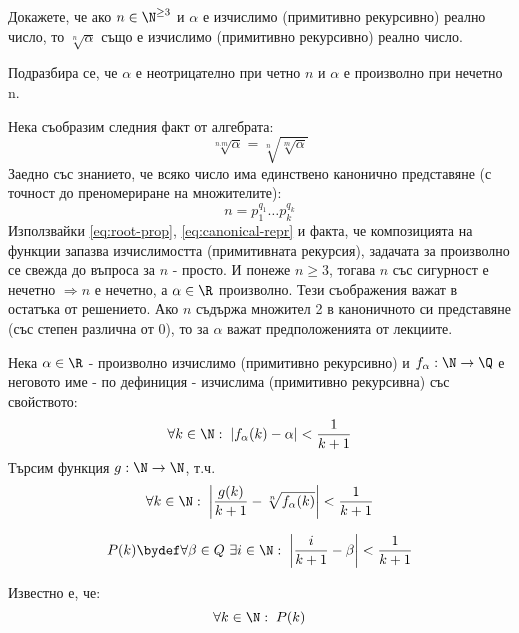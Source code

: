\begin{problem}
    Докажете, че ако $n \in \N^{\geq 3}$ и $\alpha$ е изчислимо (примитивно рекурсивно) реално число, то $\sqrt[n]{\alpha}$ също е изчислимо (примитивно рекурсивно) реално число.
    
    Подразбира се, че $\alpha$ е неотрицателно при четно $n$ и $\alpha$ е произволно при нечетно n.
\end{problem}
\begin{solution}
    Нека съобразим следния факт от алгебрата:
    \begin{equation}\label{eq:root-prop}
        \sqrt[n.m]{\alpha} = \sqrt[n]{\sqrt[m]{\alpha}}
    \end{equation}
    Заедно със знанието, че всяко число има единствено канонично представяне (с точност до преномериране на множителите):
    \begin{equation}\label{eq:canonical-repr}
        n = p_1^{q_1} \dots p_k^{q_k}
    \end{equation}
    Използвайки \eqref{eq:root-prop}, \eqref{eq:canonical-repr} и факта, че композицията на функции запазва изчислимостта (примитивната рекурсия), задачата за произволно се свежда до въпроса за $n$ - просто. И понеже $n \geq 3$, тогава $n$ със сигурност е нечетно $\Rightarrow n$ е нечетно, а $\alpha \in \R$ произволно. Тези съображения важат в остатъка от решението. Ако $n$ съдържа множител 2 в каноничното си представяне (със степен различна от 0), то за $\alpha$ важат предположенията от лекциите.

    Нека $\alpha \in \R$ - произволно изчислимо (примитивно рекурсивно) и $f_\alpha: \N \to \Q$ е неговото име - по дефиниция - изчислима (примитивно рекурсивна) със свойството:
    \begin{equation*}
        \forall k\in \N:\; \left\lvert f_\alpha(k) - \alpha \right\rvert < \frac{1}{k+1}
    \end{equation*}
    Търсим функция $g: \N \to \N$, т.ч.
    \begin{equation*}
        \forall k\in \N:\; \left\lvert \frac{g(k)}{k+1} - \sqrt[n]{f_\alpha(k)} \right\rvert < \frac{1}{k+1}
    \end{equation*}
    \begin{definition}
        \begin{equation*}
            P(k) \bydef \forall \beta \in Q\ \exists i \in \N:\; \left\lvert \frac{i}{k+1} - \beta\right\rvert < \frac{1}{k+1}
        \end{equation*}
    \end{definition}
    \begin{fact}
    Известно е, че:
        \begin{equation*}
            \forall k \in \N:\; P(k)
        \end{equation*}
    \end{fact}
\end{solution}